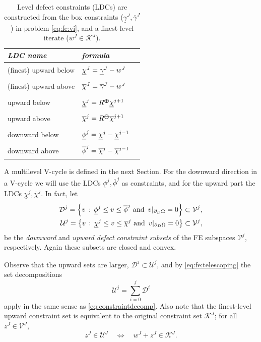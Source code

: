 \documentclass[letterpaper,final,12pt,reqno]{amsart}
\theoremstyle{cstyle}
\theoremstyle{cstyle*}
\theoremstyle{dstyle}
\numberwithin{equation}{section}
\numberwithin{figure}{section}
\numberwithin{table}{section}
\numberwithin{theorem}{section}
\newcommand{\cK}{\mathcal{K}}
\newcommand{\maxR}{R^{\bm{\oplus}}}
\newcommand{\minR}{R^{\bm{\ominus}}}
\begin{document}
\begin{table}[H]
\begin{tabular}{llc}
\emph{LDC name}        & \emph{formula} \\ \hline
(finest) upward below & ${\Large \strut} \underline{\chi}^J = \underline{\gamma}^J - w^J$ \\
(finest) upward above & ${\Large \strut} \overline{\chi}^J = \overline{\gamma}^J - w^J$ \\
upward below          & ${\Large \strut} \underline{\chi}^{j} = \maxR \underline{\chi}^{j+1}$ \\
upward above          & ${\Large \strut} \overline{\chi}^{j} = \minR \overline{\chi}^{j+1}$ \\
downward below        & ${\Large \strut} \underline{\phi}^j = \underline{\chi}^j - \underline{\chi}^{j-1}$ \\
downward above        & ${\Large \strut} \overline{\phi}^j = \overline{\chi}^j - \overline{\chi}^{j-1}$ \\
\end{tabular}

\medskip
\caption{Level defect constraints (LDCs) are constructed from the box constraints ($\underline{\gamma}^J,\overline{\gamma}^J$) in problem \eqref{eq:fe:vi}, and a finest level iterate ($w^J \in \cK^J$).}
\label{tab:ldcs}
\end{table}

A multilevel V-cycle is defined in the next Section.  For the downward direction in a V-cycle we will use the LDCs $\underline{\phi}^j,\overline{\phi}^j$ as constraints, and for the upward part the LDCs $\underline{\chi}^j,\overline{\chi}^j$.  In fact, let
\begin{align}
\mathcal{D}^j = \left\{v \,:\, \underline{\phi}^j \le v \le \overline{\phi}^j \text{ and } \, v|_{\partial_D\Omega} = 0\right\} \subset \mathcal{V}^j, \label{eq:fe:constraintsets} \\
\mathcal{U}^j = \left\{v\,:\, \underline{\chi}^j \le v \le \overline{\chi}^j \text{ and } \, v|_{\partial_D\Omega} = 0\right\} \subset \mathcal{V}^j, \notag
\end{align}
be the \emph{downward} and \emph{upward defect constraint subsets} of the FE subspaces $\mathcal{V}^j$, respectively.  Again these subsets are closed and convex.

Observe that the upward sets are larger, $\mathcal{D}^j \subset \mathcal{U}^j$, and by \eqref{eq:fe:telescoping} the set decompositions
\begin{equation}
\mathcal{U}^j = \sum_{i=0}^j \mathcal{D}^i \label{eq:fe:constraintdecomp}
\end{equation}
apply in the same sense as \eqref{eq:constraintdecomp}.  Also note that the finest-level upward constraint set is equivalent to the original constraint set $\mathcal{K}^J$; for all $z^J \in \mathcal{V}^J$,
\begin{equation}
z^J \in \mathcal{U}^J \quad \iff \quad w^J+z^J \in \mathcal{K}^J. \label{eq:fe:finestlevelequivalent}
\end{equation}
\end{document}

